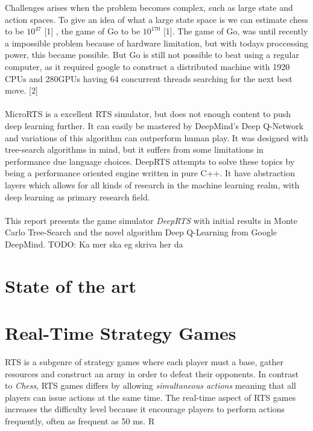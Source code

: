 \documentclass[fleqn,10pt]{article} %
\newcommand{\todo}[1]{}
\renewcommand{\todo}[1]{{\color{red} TODO: {#1}}}
\begin{document}
Challenges arises when the problem becomes complex, such as large state and action spaces. To give an idea of what a large state space is we can estimate chess to be $10^{47}$ [1] , the game of Go to be $10^{170}$ [1]. The game of Go, was until recently a impossible problem because of hardware limitation, but with todays proccessing power, this became possible. But Go is still not possible to beat using a regular computer, as it required google to construct a distributed machine with 1920 CPUs and 280GPUs having 64 concurrent threads  searching for the next best move. [2]
\\
\\
MicroRTS is a excellent RTS simulator, but does not enough content to push deep learning further. It can easily be mastered by DeepMind's Deep Q-Network and variations of this algorithm can outperform human play. It was designed with tree-search algorithms in mind, but it suffers from some limitations in performance due language choices. DeepRTS attempts to solve these topics by being a performance oriented engine written in pure C++. It have abstraction layers which allows for all kinds of research in the machine learning realm, with deep learning as primary research field.
\\
\\
This report presents the game simulator \textit{DeepRTS} with initial results in Monte Carlo Tree-Search and the novel algorithm Deep Q-Learning from Google DeepMind. \todo{Ka mer ska eg skriva her da}
\section{State of the art} %


\section{Real-Time Strategy Games}
RTS is a subgenre of strategy games where each player must a base, gather resources and construct an army in order to defeat their opponents. In contrast to \textit{Chess}, RTS games differs by allowing \textit{simultaneous actions} meaning that all players can issue actions at the same time. The real-time aspect of RTS games increases the difficulty level because it encourage players to perform actions frequently, often as frequent as 50 ms. R
\end{document}
